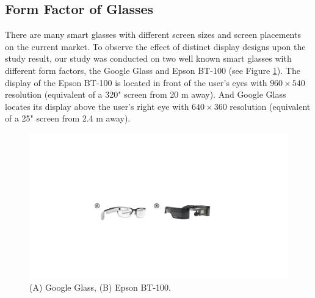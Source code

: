 \documentclass{sigchi}
\begin{document}
\subsection {Form Factor of Glasses}
  There are many smart glasses with different screen sizes and screen placements on the current market. To observe the effect of distinct display designs upon the study result, our study was conducted on two well known smart glasses with different form factors, the Google Glass and Epson BT-100 (see Figure \ref{fig:Glasses}). The display of the Epson BT-100 is located in front of the user's eyes with $960 \times 540$ resolution (equivalent of a 320" screen from 20 m away)\cite{BT100}. And Google Glass locates its display above the user's right eye with $640 \times 360$ resolution (equivalent of a 25" screen from 2.4 m away)\cite{GoogleGlass}.  

  \begin{figure}[!h]
  \centering
  \includegraphics[width=1\columnwidth]{Glasses.pdf}
  \caption{(A) Google Glass, (B) Epson BT-100.}
  \label{fig:Glasses}
  \end{figure}  
\end{document}
